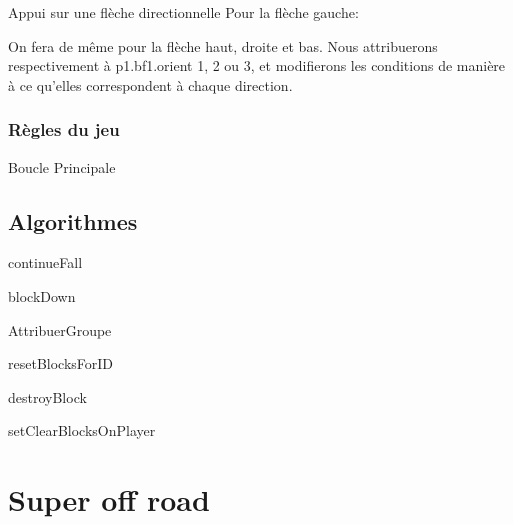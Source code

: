 \documentclass[10pt,dvipsnames,final]{beamer}
\begin{document}
\begin{frame}{Appui sur une flèche directionnelle}
Pour la flèche gauche:

On fera de même pour la flèche haut, droite et bas. Nous attribuerons respectivement à p1.bf1.orient 1, 2 ou 3, et modifierons les conditions de manière à ce qu'elles correspondent à chaque direction.
\end{frame}

\subsubsection{Règles du jeu}

\begin{frame}[allowframebreaks]{Boucle Principale}

\end{frame}

\subsection{Algorithmes}

\begin{frame}{continueFall}

\end{frame}

\begin{frame}{blockDown}

\end{frame}

\begin{frame}[allowframebreaks]{AttribuerGroupe}

\end{frame}

\begin{frame}{resetBlocksForID}

\end{frame}

\begin{frame}{destroyBlock}

\end{frame}

\begin{frame}{setClearBlocksOnPlayer}

\end{frame}

\section{Super off road}
\end{document}

